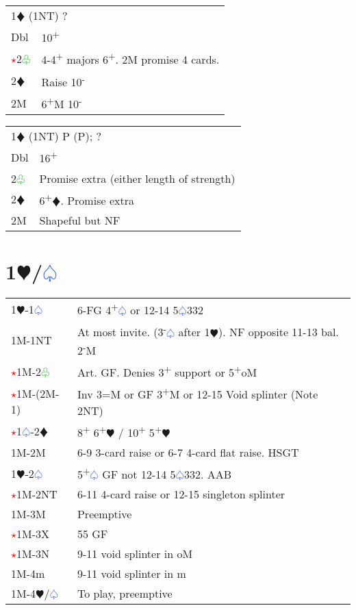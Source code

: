 \documentclass{article}
\renewcommand{\sp}{\textcolor{RoyalBlue}{$\varspade$}}
\newcommand{\he}{\textcolor{RubineRed}{$\varheart$}}
\newcommand{\di}{\textcolor{Peach}{$\vardiamond$}}
\newcommand{\cl}{\textcolor{LimeGreen}{$\varclub$}}
\newcommand{\nt}{\relsize{-1}NT\relsize{1}}
\newcommand{\up}{\textsuperscript{+}}
\newcommand{\down}{\textsuperscript{-}}
\newcommand{\al}{\textcolor{red}{$\star$}}
\begin{document}
\medskip

\begin{tabular}{|l|p{6.5cm}}
	\multicolumn{2}{l}{1\di{} (1\nt{}) ?}\\
	Dbl & 10\up \\
	\al{}2\cl{} & 4-4\up{} majors 6\up{}. 2M promise 4 cards. \\
	2\di{} & Raise 10\down{} \\
	2M & 6\up{}M 10\down{} \\
\end{tabular}

\medskip

\begin{tabular}{|l|p{6.5cm}}
	\multicolumn{2}{l}{1\di{} (1\nt{}) P (P); ?}\\
	Dbl & 16\up{} \\
	2\cl{} & Promise extra (either length of strength) \\
	2\di{} & 6\up{}\di{}. Promise extra \\
	2M & Shapeful but NF \\
\end{tabular}

\section{1\he/\sp{}}

\begin{tabular}{|l|p{6.5cm}}
	1\he{}-1\sp{} & 6-FG 4\up\sp{} or 12-14 5\sp{}332 \\
	1M-1\nt{}& At most invite. (3\down\sp{} after 1\he{}). NF opposite 11-13 bal. 2\down{}M \\
	\al{}1M-2\cl{} & Art. GF. Denies 3\up{} support or 5\up{}oM \\
	\al{}1M-(2M-1) & Inv 3=M or GF 3\up{}M or 12-15 Void splinter (Note 2\nt{}) \\
	\al{}1\sp{}-2\di{} & 8\up{} 6\up{}\he{} / 10\up{} 5\up{}\he{} \\ 
	1M-2M & 6-9 3-card raise or 6-7 4-card flat raise. HSGT \\
	1\he{}-2\sp{} & 5\up{}\sp{} GF not 12-14 5\sp{}332. AAB \\ 
	\al{}1M-2\nt & 6-11 4-card raise or 12-15 singleton splinter \\
	1M-3M & Preemptive \\
	\al{}1M-3X & 55 GF \\
	\al{}1M-3N & 9-11 void splinter in oM \\
	1M-4m & 9-11 void splinter in m \\
	1M-4\he{}/\sp{} & To play, preemptive \\ 

\end{tabular}
\end{document}
